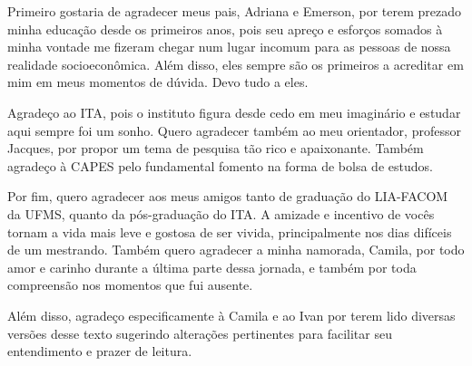 Primeiro gostaria de agradecer meus pais, Adriana e Emerson, por terem prezado minha educação 
desde os primeiros anos, pois seu apreço e esforços somados à minha vontade me 
fizeram chegar num lugar incomum para as pessoas de nossa realidade 
socioeconômica. Além disso, eles sempre são os 
primeiros a acreditar em mim em meus momentos de dúvida. Devo 
tudo a eles.

Agradeço ao ITA, pois o instituto figura desde cedo em meu imaginário e estudar aqui sempre foi um sonho. Quero agradecer também ao 
meu orientador, professor Jacques, por propor um tema de pesquisa tão rico e apaixonante. Também agradeço à CAPES pelo fundamental fomento na 
forma de bolsa de estudos.

Por fim, quero agradecer aos meus amigos tanto de graduação do LIA-FACOM da UFMS, quanto da pós-graduação do ITA. A amizade e incentivo de vocês tornam a 
vida mais leve e gostosa de ser vivida, principalmente nos dias difíceis 
de um mestrando. Também quero agradecer a minha namorada, Camila, por 
todo amor e carinho durante a última parte dessa jornada, e também por toda compreensão nos momentos que fui ausente.

Além disso, agradeço especificamente à Camila e ao Ivan por terem lido 
diversas versões desse texto sugerindo alterações pertinentes para 
facilitar seu entendimento e prazer de leitura.